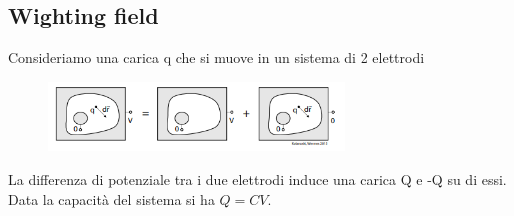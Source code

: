 \subsection{Wighting field}
Consideriamo una carica q che si muove in un sistema di 2 elettrodi
\begin{figure}[H]
    \centering
    \includegraphics[width=0.7\textwidth,frame]{Chapters/images/Interazione_radiazione_materia/image-20220223201749719.png}
    \captionsetup{width=0.7\textwidth}
\end{figure}
La differenza di potenziale tra i due elettrodi induce una carica Q e -Q su di essi. Data la capacità del sistema si ha $Q=CV$.
